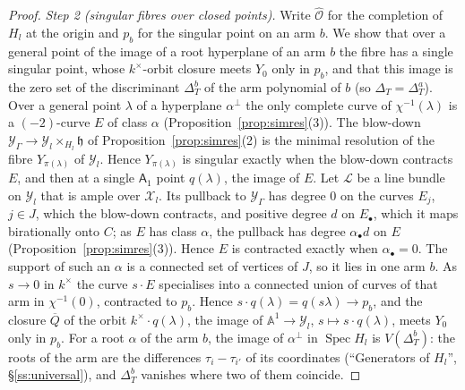 \documentclass[11pt]{amsart}
\numberwithin{table}{section}
\numberwithin{figure}{section}
\numberwithin{equation}{section}
\theoremstyle{definition}
\theoremstyle{plain}
\newcommand{\cX}{\mathcal{X}}
\newcommand{\cY}{\mathcal{Y}}
\newcommand{\h}{\mathfrak{h}}
\newcommand{\bul}{\bullet}
\newcommand{\A}{\mathbb{A}}
\DeclareMathOperator{\Spec}{Spec}
\begin{document}
\begin{proof}
\emph{Step 2 (singular fibres over closed points).} Write $\widehat{\mathcal O}$ for the completion of $H_l$ at the origin and $p_b$ for the singular point on an arm $b$. We show that over a general point of the image of a root hyperplane of an arm $b$ the fibre has a single singular point, whose $k^\times$-orbit closure meets $Y_0$ only in $p_b$, and that this image is the zero set of the discriminant $\Delta_T^b$ of the arm polynomial of $b$ (so $\Delta_T = \Delta_T^a$). Over a general point $\lambda$ of a hyperplane $\alpha^\perp$ the only complete curve of $\chi^{-1}(\lambda)$ is a $(-2)$-curve $E$ of class $\alpha$ (Proposition~\ref{prop:simres}(3)). The blow-down $\cY_\Gamma \to \cY_l \times_{H_l} \h$ of Proposition~\ref{prop:simres}(2) is the minimal resolution of the fibre $Y_{\pi(\lambda)}$ of $\cY_l$. Hence $Y_{\pi(\lambda)}$ is singular exactly when the blow-down contracts $E$, and then at a single $\mathsf{A}_1$ point $q(\lambda)$, the image of $E$. Let $\mathcal L$ be a line bundle on $\cY_l$ that is ample over $\cX_l$. Its pullback to $\cY_\Gamma$ has degree $0$ on the curves $E_j$, $j \in J$, which the blow-down contracts, and positive degree $d$ on $E_\bul$, which it maps birationally onto $C$; as $E$ has class $\alpha$, the pullback has degree $\alpha_\bul d$ on $E$ (Proposition~\ref{prop:simres}(3)). Hence $E$ is contracted exactly when $\alpha_\bul = 0$. The support of such an $\alpha$ is a connected set of vertices of $J$, so it lies in one arm $b$. As $s \to 0$ in $k^\times$ the curve $s\cdot E$ specialises into a connected union of curves of that arm in $\chi^{-1}(0)$, contracted to $p_b$. Hence $s\cdot q(\lambda) = q(s\lambda) \to p_b$, and the closure $\overline Q$ of the orbit $k^\times\cdot q(\lambda)$, the image of $\A^1 \to \cY_l$, $s \mapsto s\cdot q(\lambda)$, meets $Y_0$ only in $p_b$. For a root $\alpha$ of the arm $b$, the image of $\alpha^\perp$ in $\Spec H_l$ is $V(\Delta_T^b)$: the roots of the arm are the differences $\tau_i - \tau_{i'}$ of its coordinates (``Generators of $H_l$'', \S\ref{ss:universal}), and $\Delta_T^b$ vanishes where two of them coincide.


\end{proof}
\end{document}
